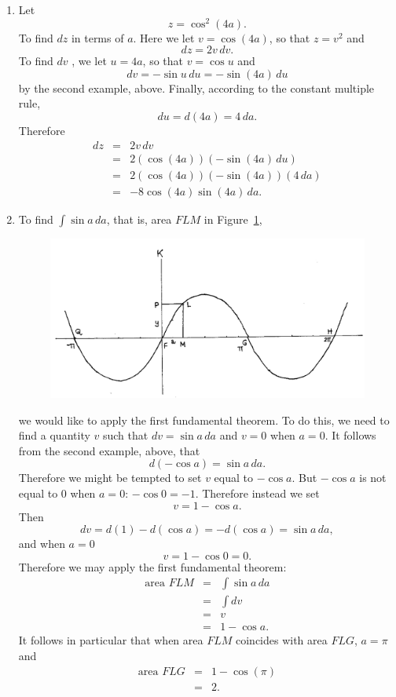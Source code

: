 \documentclass[polutonikogreek,english,twoside,openright]{article}
\begin{document}
\begin{enumerate}
\item Let 
$$z = \cos^2 (4a).$$
To find $dz$ in terms of $a$.  Here we let $v= \cos (4a)$, so that $z = v^2$ and 
$$dz = 2v\,dv.$$
To find $dv$ , we let $u = 4a$, so that $v = \cos u$ and
$$dv =  -\sin u \,du = -\sin(4a)\,du$$
by the second example, above.  Finally, according to the constant multiple rule,
$$du = d(4a) = 4\,da.$$
Therefore 
\begin{eqnarray*}
dz & = & 2v\,dv\\
& = & 2(\cos(4a))(-\sin(4a)\,du)\\
& = & 2(\cos(4a))(-\sin(4a))(4\,da)\\
& = & -8\cos(4a)\sin(4a)\,da.
\end{eqnarray*}


\item \label{sumsin}To find $\int\!\sin a \,da$, that is, area $FLM$ in Figure~\ref{sinecurve2},
\begin{figure}[htp]
\begin{center}
\includegraphics[width=\textwidth]{fig/Figure48}
\caption{}
\label{sinecurve2}
\vspace{-10pt}
\end{center}
\end{figure} 
we would like to apply the first fundamental theorem.  To do this, we need to find a quantity $v$ such that $dv = \sin a\,da$ and $v=0$ when $a=0$.  It follows from the second example, above, that
$$d(-\cos a) = \sin a\,da.$$ 
Therefore we might be tempted to set $v$ equal to $-\cos a$.  But $-\cos a$ is not equal to 0 when $a=0$: $-\cos 0 = -1$.  Therefore instead we set 
$$v = 1-\cos a.$$
Then 
$$dv = d(1) -d(\cos a) = -d(\cos a) = \sin a\,da,$$
and when $a=0$ 
$$v = 1 - \cos 0 = 0.$$
Therefore we may apply the first fundamental theorem:
\begin{eqnarray*}
\mbox{area }FLM & = & \int\! \sin a \,da \\
& = & \int\! dv \\
& = & v\\
& = & 1 - \cos a.
\end{eqnarray*}
It follows in particular that when area $FLM$ coincides with area $FLG$, $a= \pi$ and
\begin{eqnarray*}
\mbox{area }FLG & = & 1 - \cos (\pi)\\
& = & 2.
\end{eqnarray*}


\end{enumerate}
\end{document}
